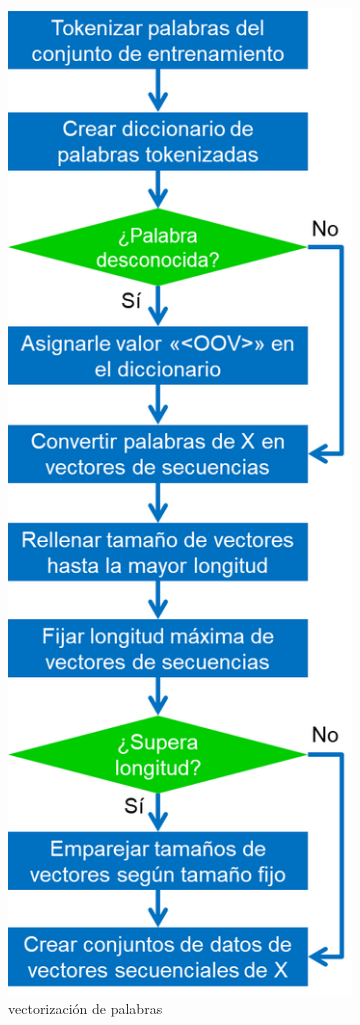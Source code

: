 \begin{figure}[!ht]
	\centering
	\small
	\begin{subfigure}{.50\textwidth}
		\centering
		\includegraphics[width=0.65\linewidth]{3/figures/description_text_to_sequence.png}
		\caption{vectorización de palabras}
	\end{subfigure}%
	\begin{subfigure}{.50\textwidth}

\end{subfigure}
\end{figure}
